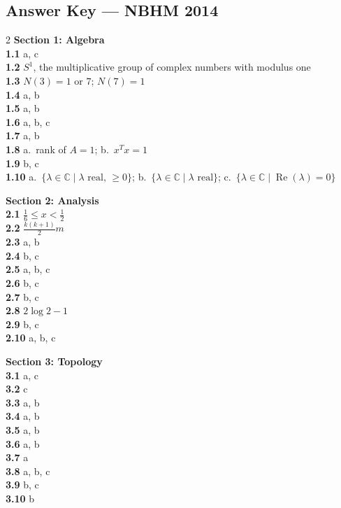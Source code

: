 \documentclass[11pt,a4paper]{article}
\newcommand{\C}{\mathbb{C}}
\newcommand{\RePart}{\operatorname{Re}}
\newcommand{\examsec}[1]{%
  \subsection*{#1}
  \vspace{-2pt}
}
\begin{document}
\examsec{Answer Key --- NBHM 2014}
\begin{multicols}{2}
\textbf{Section 1: Algebra}\\
\textbf{1.1} a, c\\
\textbf{1.2} $S^1$, the multiplicative group of complex numbers with modulus one\\
\textbf{1.3} $N(3) = 1$ or $7$; $N(7) = 1$\\
\textbf{1.4} a, b\\
\textbf{1.5} a, b\\
\textbf{1.6} a, b, c\\
\textbf{1.7} a, b\\
\textbf{1.8} a.\ rank of $A = 1$; b.\ $x^T x = 1$\\
\textbf{1.9} b, c\\
\textbf{1.10} a.\ $\{\lambda \in \C \mid \lambda \text{ real, } \ge 0\}$; b.\ $\{\lambda \in \C \mid \lambda \text{ real}\}$; c.\ $\{\lambda \in \C \mid \RePart(\lambda) = 0\}$

\medskip
\textbf{Section 2: Analysis}\\
\textbf{2.1} $\frac{1}{6} \le x < \frac{1}{2}$\\
\textbf{2.2} $\frac{k(k+1)}{2}m$\\
\textbf{2.3} a, b\\
\textbf{2.4} b, c\\
\textbf{2.5} a, b, c\\
\textbf{2.6} b, c\\
\textbf{2.7} b, c\\
\textbf{2.8} $2\log 2 - 1$\\
\textbf{2.9} b, c\\
\textbf{2.10} a, b, c

\medskip
\textbf{Section 3: Topology}\\
\textbf{3.1} a, c\\
\textbf{3.2} c\\
\textbf{3.3} a, b\\
\textbf{3.4} a, b\\
\textbf{3.5} a, b\\
\textbf{3.6} a, b\\
\textbf{3.7} a\\
\textbf{3.8} a, b, c\\
\textbf{3.9} b, c\\
\textbf{3.10} b


\end{multicols}
\end{document}
